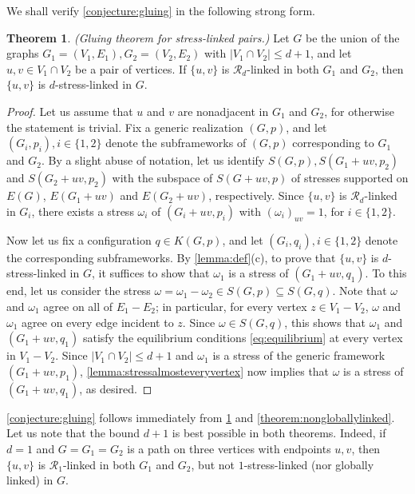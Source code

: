 \documentclass[11pt,a4paper,dvipsnames]{scrartcl}
\theoremstyle{definition}
\newtheorem{theorem}{Theorem}[section]
\newcommand{\strongly}[1]{${#1}$-stress-linked}
\newcommand{\sharedstresskernel}[1]{K}
\begin{document}
\noindent We shall verify \cref{conjecture:gluing} in the following strong form.

\begin{theorem}\label{theorem:gluing} \emph{(Gluing theorem for stress-linked pairs.)}\newline
    Let $G$ be the union of the graphs $G_1 = (V_1,E_1), G_2 = (V_2,E_2)$ with $|V_1 \cap V_2| \leq d+1$, and let $u,v \in V_1 \cap V_2$ be a pair of vertices. If $\{u,v\}$ is $\mathcal{R}_d$-linked in both $G_1$ and $G_2$, then $\{u,v\}$ is \strongly{d} in $G$.
\end{theorem}
\begin{proof}
    Let us assume that $u$ and $v$ are nonadjacent in $G_1$ and $G_2$, for otherwise the statement is trivial. Fix a generic realization $(G,p)$, and let $(G_i,p_i), i \in \{1,2\}$ denote the subframeworks of $(G,p)$ corresponding to $G_1$ and $G_2$. By a slight abuse of notation, let us identify $S(G,p), S(G_1+uv,p_2)$ and $S(G_2+uv,p_2)$ with the subspace of $S(G+uv,p)$ of stresses supported on $E(G)$, $E(G_1+uv)$ and $E(G_2+uv)$, respectively. Since $\{u,v\}$ is $\mathcal{R}_d$-linked in $G_i$, there exists a stress $\omega_i$ of $(G_i+uv,p_i)$ with ${(\omega_i)}_{uv} = 1$, for $i \in \{1,2\}$. 

    Now let us fix a configuration $q \in \sharedstresskernel{d}(G,p)$, and let $(G_i,q_i), i \in \{1,2\}$ denote the corresponding subframeworks. By \cref{lemma:def}(c), to prove that $\{u,v\}$ is \strongly{d} in $G$, it suffices to show that $\omega_1$ is a stress of $(G_1 + uv,q_1)$. To this end, let us consider the stress $\omega = \omega_1 - \omega_2 \in S(G,p) \subseteq S(G,q)$. Note that $\omega$ and $\omega_1$ agree on all of $E_1 - E_2$; in particular, for every vertex $z \in V_1 - V_2$, $\omega$ and $\omega_1$ agree on every edge incident to $z$. Since $\omega \in S(G,q)$, this shows that $\omega_1$ and $(G_1+uv,q_1)$ satisfy the equilibrium conditions \cref{eq:equilibrium} at every vertex in $V_1 - V_2$. Since $|V_1 \cap V_2| \leq d+1$ and $\omega_1$ is a stress of the generic framework $(G_1+uv,p_1)$, \cref{lemma:stressalmosteveryvertex} now implies that $\omega$ is a stress of $(G_1+uv,q_1)$, as desired.
\end{proof}

\cref{conjecture:gluing} follows immediately from \cref{theorem:gluing} and \cref{theorem:nongloballylinked}.
Let us note that the bound $d+1$ is best possible in both theorems. Indeed, if $d=1$ and $G=G_1=G_2$ is a path on three vertices with endpoints $u,v$, then $\{u,v\}$ is $\mathcal{R}_1$-linked in both $G_1$ and $G_2$, but not \strongly{1} (nor globally linked) in $G$.
\end{document}
